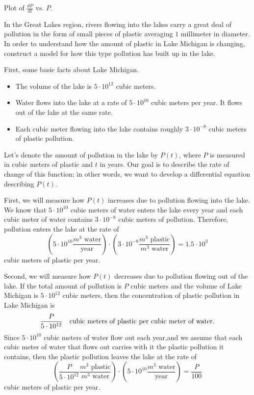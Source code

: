\begin{marginfigure}[8cm] %
\caption{Plot of $\frac{dP}{dt}$ vs. $P$. } \label{F:6.7.Ex3-1}
\end{marginfigure}

\begin{example} \label{eg:6.7.3} %
In the Great Lakes region, rivers flowing into the lakes carry a great
deal of pollution in the form of small pieces of plastic averaging $1$
millimeter in diameter.  In order to understand how the amount of
plastic in Lake Michigan is changing, construct a model for how this type pollution has built up in the lake.


\solution First, some basic facts about Lake Michigan.
\begin{itemize}
  \item The volume of the lake is
    $5\cdot10^{12}$ cubic meters.
  \item Water flows into the lake at a rate of
    $5\cdot10^{10}$ cubic meters per year.  It flows out of the lake
    at the same rate.
  \item Each cubic meter flowing
    into the lake contains roughly $3\cdot10^{-8}$ cubic meters of
    plastic pollution.
\end{itemize}

Let's denote the amount of pollution in the lake by $P(t)$, where $P$
is measured in cubic meters of plastic and $t$ in years.  Our goal
is to describe the rate of change of this function;  in other
words, we want to develop a differential equation describing $P(t)$.

First, we will measure how $P(t)$ increases due to pollution flowing
into the lake.  We know that $5\cdot10^{10}$ cubic meters of water
enters the lake every year and each cubic meter of water contains
$3\cdot10^{-8}$ cubic meters of pollution.  Therefore, pollution
enters the lake at the rate of
$$ \left(5\cdot 10^{10} \frac{m^3 \mbox{\ water}}{\mbox{year}}\right) \cdot \left(3\cdot10^{-8} \frac{m^3 \mbox{\ plastic}}{m^3 \mbox{\ water}} \right) = 1.5\cdot 10^3$$
cubic meters of plastic per year.

Second, we will measure how $P(t)$ decreases due to pollution flowing
out of the lake.  If the total amount of pollution is $P$ cubic
meters and the volume of Lake Michigan is $5\cdot 10^{12}$ cubic
meters, then the concentration of plastic pollution in Lake Michigan is
$$
\frac{P}{5\cdot10^{12}} \quad \hbox{cubic meters of plastic per cubic meter of water}.
$$
Since $5\cdot10^{10}$ cubic meters of water flow out each year,and we assume that each cubic meter of water that flows out carries with it the plastic pollution it contains, then
the plastic pollution leaves the lake at the rate of
$$ \left(\frac{P}{5\cdot10^{12}} \frac{m^3 \mbox{\ plastic}}{m^3 \mbox{\ water}} \right) \cdot \left(5\cdot10^{10} \frac{m^3 \mbox{\ water}}{\mbox{year}} \right)=\frac{P}{100} $$
cubic meters of plastic per year.


\end{example}
